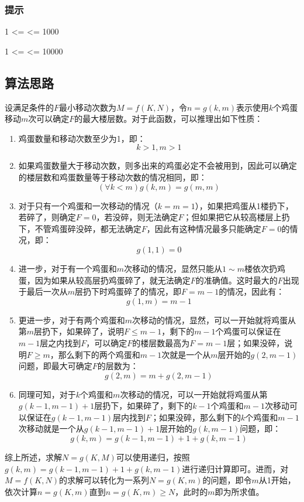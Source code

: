 


\subsubsection*{提示}
1 <=  <= 1000

1 <=  <= 10000

\subsection{算法思路}

设满足条件的$F$最小移动次数为$M=f(K,N)$，令$n=g(k,m)$表示使用$k$个鸡蛋移动$m$次可以确定$F$的最大楼层数。对于此函数，可以推理出如下性质：
\begin{enumerate}
	\item 鸡蛋数量和移动次数至少为1，即：$$k>1,m>1$$
	\item 如果鸡蛋数量大于移动次数，则多出来的鸡蛋必定不会被用到，因此可以确定的楼层数和鸡蛋数量等于移动次数的情况相同，即：$$(\forall k<m)g(k,m)=g(m,m)$$
	\item 对于只有一个鸡蛋和一次移动的情况（$k=m=1$），如果把鸡蛋从1楼扔下，若碎了，则确定$F=0$，若没碎，则无法确定$F$；但如果把它从较高楼层上扔下，不管鸡蛋碎没碎，都无法确定$F$，因此有这种情况最多只能确定$F=0$的情况，即：$$g(1,1)=0$$
	\item 进一步，对于有一个鸡蛋和$m$次移动的情况，显然只能从$1\sim m$楼依次扔鸡蛋，因为如果从较高层扔鸡蛋碎了，就无法确定$F$的准确值。这时最大的$F$出现于最后一次从$m$层扔下时鸡蛋碎了的情况，即$F=m-1$的情况，因此有：$$g(1,m)=m-1$$
	\item 更进一步，对于有两个鸡蛋和$m$次移动的情况，显然，可以一开始就将鸡蛋从第$m$层扔下，如果碎了，说明$F\leq m-1$，剩下的$m-1$个鸡蛋可以保证在$m-1$层之内找到$F$，可以确定$F$的楼层数最高为$F=m-1$层；如果没碎，说明$F\geq m$，那么剩下的两个鸡蛋和$m-1$次就是一个从$m$层开始的$g(2,m-1)$问题，即最大可确定$F$的层数为：$$g(2,m)=m+g(2,m-1)$$
	\item 同理可知，对于$k$个鸡蛋和$m$次移动的情况，可以一开始就将鸡蛋从第$g(k-1,m-1)+1$层扔下，如果碎了，剩下的$k-1$个鸡蛋和$m-1$次移动可以保证在$g(k-1,m-1)$层内找到$F$；如果没碎，那么剩下的$k$个鸡蛋和$m-1$次移动就是一个从$g(k-1,m-1)+1$层开始的$g(k,m-1)$问题，即：$$g(k,m)=g(k-1,m-1)+1+g(k,m-1)$$
\end{enumerate}

综上所述，求解$N=g(K,M)$可以使用递归，按照$g(k,m)=g(k-1,m-1)+1+g(k,m-1)$进行递归计算即可。进而，对$M=f(K,N)$的求解可以转化为一系列$N=g(K,m)$的问题，即令$m$从1开始，依次计算$n=g(K,m)$直到$n=g(K,m)\geq N$，此时的$m$即为所求值。

